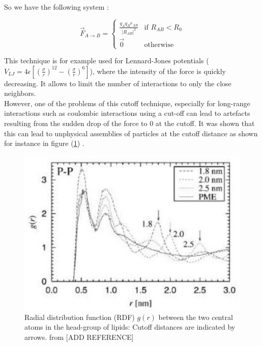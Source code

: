 \documentclass[12pt,twoside,a4paper]{report}
\begin{document}
So we have the following system :


\begin{equation}
  \overrightarrow{F}_{A \rightarrow B}  =
	\begin{cases}
	  \frac{q_A q_B \hat{r}_{AB} }{|R_{AB}|^2}  & \text{if } R_{AB} < R_0 \\
	  \overrightarrow{0} & \text{otherwise}
	\end{cases}
\end{equation}

This technique is for example used for Lennard-Jones potentials ($V_{LJ} = 4\epsilon [(\frac{\sigma}{r})^12 - (\frac{\sigma}{r})^6] $), where the intensity of the force is quickly decreasing. It allows to limit the number of interactions to only the close neighbors.\\

However, one of the problems of this cutoff technique, especially for long-range interactions such as coulombic interactions using a cut-off can lead to artefacts resulting from the sudden drop of the force to 0 at the cutoff. It was shown that this can lead to unphysical assemblies of particles at the cutoff distance as shown for instance in figure (\ref{fig:artefact}) .

\begin{figure}[H]

\includegraphics[scale=0.8]{artefact}
 \centering
 
\caption{Radial distribution function (RDF) $g(r)$ between the two
central atoms in the head-group of lipids: Cutoff distances are indicated by arrows. from [ADD REFERENCE]}

\label{fig:artefact}

\end{figure}
\end{document}
